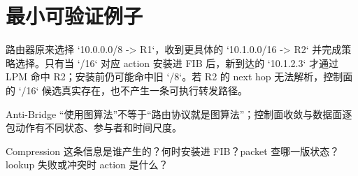 \documentclass[UTF8,fontset=none,11pt,a4paper]{ctexart}
\begin{document}
\section{最小可验证例子}

路由器原来选择 `10.0.0.0/8 -> R1`，收到更具体的 `10.1.0.0/16 -> R2` 并完成策略选择。只有当 `/16` 对应 action 安装进 FIB 后，新到达的 `10.1.2.3` 才通过 LPM 命中 R2；安装前仍可能命中旧 `/8`。若 R2 的 next hop 无法解析，控制面的 `/16` 候选真实存在，也不产生一条可执行转发路径。
\begin{warnbox}{Anti-Bridge}
“使用图算法”不等于“路由协议就是图算法”；控制面收敛与数据面逐包动作有不同状态、参与者和时间尺度。
\end{warnbox}
\begin{corebox}{Compression}
这条信息是谁产生的？何时安装进 FIB？packet 查哪一版状态？lookup 失败或冲突时 action 是什么？
\end{corebox}
\end{document}
